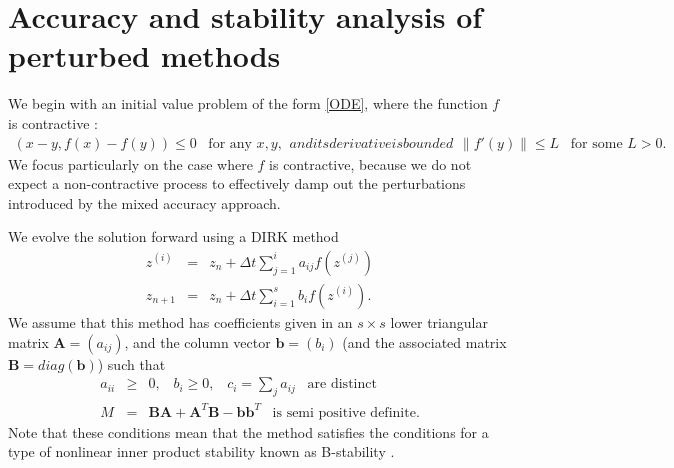 \documentclass{siamart251104}
\newcommand{\dt}{\Delta t}
\newcommand{\m}[1]{\mathbf{#1}}
\newcommand{\vb}{\m{b}}
\newcommand{\mA}{\m{A}}
\newcommand{\mB}{\m{B}}
\begin{document}
\section{Accuracy and stability analysis of perturbed methods} \label{sec:stability}

We begin with an initial value problem of the form
\eqref{ODE}, where the function $f$ is contractive \cite{hairer1996solving2}:
\begin{subequations}
\begin{eqnarray} \label{contractivity}
    \left( x -  y , f(x) -  f(y) \right)  \leq 0 \; \; \; 
    \mbox{for any $x, y$},
\end{eqnarray}
and its derivative is bounded
\begin{eqnarray} \label{Derivative}
\left\| f'(y) \right\| \leq L \; \; \; \mbox{for some $L>0$.}
\end{eqnarray}
\end{subequations}
We focus particularly on the case where $f$ is contractive, 
because we do not expect a  non-contractive process to effectively
damp out   the perturbations introduced by the mixed accuracy approach.


We evolve the solution forward using   a DIRK method 
\begin{subequations} \label{DIRK}
\begin{eqnarray} 
    z^{(i)} & = & z_n + \dt \sum_{j=1}^{i} a_{ij} f(z^{(j)})   \\
    z_{n+1} & = & z_n + \dt \sum_{i=1}^s b_{i} f(z^{(i)}) .
\end{eqnarray}
\end{subequations}
We assume that this method has 
coefficients given in an $s \times s$
lower triangular matrix $\mA = (a_{ij})$, 
and the column vector $\vb = (b_i)$ (and the associated matrix $\mB = diag(\vb)$)
such that 
\begin{subequations} \label{Coefficients}
\begin{eqnarray} 
    a_{ii} & \geq & 0, \; \; \; b_i  \geq  0 ,\; \; \; 
    c_i =   \sum_j a_{ij} \; \; \; \mbox{are distinct} \\
    M & = &  \mB \mA + \mA^T \mB - \vb \vb^T 
    \; \; \; \mbox{is semi positive definite} .
\end{eqnarray} 
\end{subequations}
Note that these conditions  mean that the method 
satisfies the conditions for a type of nonlinear inner product 
stability known as B-stability \cite{CrouzeixBstab}.
\end{document}
